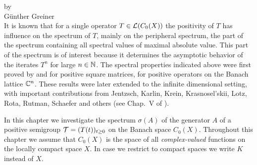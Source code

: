 \label{chap:b3}%
\thispagestyle{empty}
{\Large
\vspace*{-.75cm}
by \\[.25em]
Günther Greiner
\vspace{.75cm}
\\
}
It is known that for a single operator $T \in \mathcal{L}(C_{0}(X))$ the positivity of\/ $T$ has influence on the spectrum of\/ $T$, mainly on the peripheral spectrum, \ie the part of the spectrum containing all spectral values of maximal absolute value.
This part of the spectrum is of interest because it determines the asymptotic behavior of the iterates $T^{n}$ for large $n \in \mathbb{N}$.
The spectral properties indicated above were first proved by \textcite{perron:1907} and \textcite{frobenius:1909} for positive square matrices, \ie for positive operators on the Banach lattice $\mathbb{C}^{n}$.
These results were later extended to the infinite dimensional setting, with important contributions from Jentzsch, Karlin, Krein, Krasnosel'skii, Lotz, Rota, Rutman, Schaefer and others (see Chap.~V of \textcite{schaefer:1974}).

In this chapter we investigate the spectrum $\sigma(A)$ of the generator $A$ of a positive semigroup $\TT = (T(t))_{t \geq 0}$ on the Banach space $C_{0}(X)$.
Throughout this chapter we assume that $C_{0}(X)$ is the space of all \emph{complex-valued} functions on the locally compact space $X$.
In case we restrict to compact spaces we write $K$ instead of\/ $X$.
